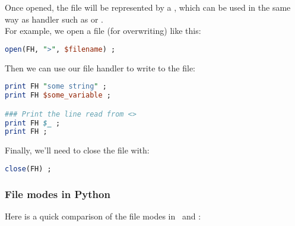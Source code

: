 	
\medskip


Once opened, the file will be represented by a , which can be used in the same way as handler such as  or . \\

For example, we open a file (for overwriting) like this:
\begin{lstlisting}[language=perl]
open(FH, ">", $filename) ;
\end{lstlisting}

Then we can use our file handler  to write to the file:
\begin{lstlisting}[language=perl]
print FH "some string" ;
print FH $some_variable ; 

### Print the line read from <>
print FH $_ ;
print FH ;
\end{lstlisting}


\bigskip


Finally, we'll need to close the file with:
\begin{lstlisting}[language=perl]
close(FH) ;
\end{lstlisting}



\newpage

\subsubsection*{File modes in Python}

Here is a quick comparison of the file modes in \python\ and \perl:

